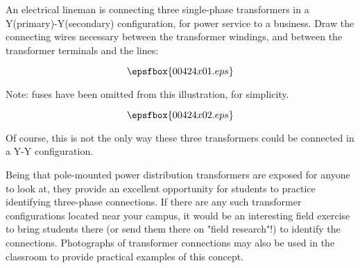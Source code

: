 

An electrical lineman is connecting three single-phase transformers in a Y(primary)-Y(secondary) configuration, for power service to a business.  Draw the connecting wires necessary between the transformer windings, and between the transformer terminals and the lines:

$$\epsfbox{00424x01.eps}$$

Note: fuses have been omitted from this illustration, for simplicity.







$$\epsfbox{00424x02.eps}$$

Of course, this is not the only way these three transformers could be connected in a Y-Y configuration.







Being that pole-mounted power distribution transformers are exposed for anyone to look at, they provide an excellent opportunity for students to practice identifying three-phase connections.  If there are any such transformer configurations located near your campus, it would be an interesting field exercise to bring students there (or send them there on "field research"!) to identify the connections.  Photographs of transformer connections may also be used in the classroom to provide practical examples of this concept.




